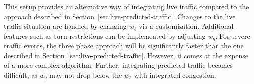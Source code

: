 \documentclass[manuscript,review]{acmart}
\begin{document}
This setup provides an alternative way of integrating live traffic compared to the approach described in Section~\ref{sec:live-predicted-traffic}.
Changes to the live traffic situation are handled by changing $w_\ell$ via a customization.
Additional features such as turn restrictions can be implemented by adjusting $w_q$.
For severe traffic events, the three phase approach will be significantly faster than the one described in Section~\ref{sec:live-predicted-traffic}.
However, it comes at the expense of a more complex algorithm.
Further, integrating predicted traffic becomes difficult, as $w_q$ may not drop below the $w_\ell$ with integrated congestion.




\end{document}
